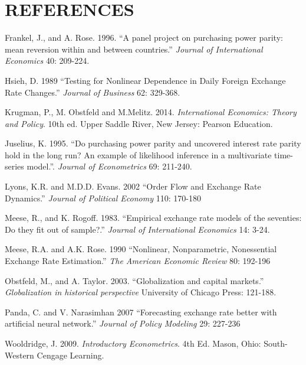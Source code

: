 \documentclass{sig-alternate-05-2015}
\begin{document}
\section*{REFERENCES}
\begin{hangref}

\item Frankel, J., and A. Rose. 1996.
``A panel project on purchasing power parity: mean reversion within and between countries.''
{\it Journal of International Economics} 40: 209-224.

\item Hsieh, D. 1989
``Testing for Nonlinear Dependence in Daily Foreign Exchange Rate Changes.''
{\it Journal of Business} 62: 329-368.

\item Krugman, P., M. Obstfeld and M.Melitz.  2014.
{\it International Economics: Theory and Policy}. 10th ed.
Upper Saddle River, New Jersey: Pearson Education.

\item Juselius, K. 1995.
``Do purchasing power parity and uncovered interest rate parity hold in the long run? An example of likelihood inference in a multivariate time-series model.''.
{\it Journal of Econometrics} 69: 211-240.

\item Lyons, K.R. and M.D.D. Evans. 2002
``Order Flow and Exchange Rate Dynamics.''
{\it Journal of Political Economy} 110: 170-180

\item Meese, R., and K. Rogoff. 1983.
``Empirical exchange rate models of the seventies: Do they fit out of sample?.'' 
{\it Journal of International Economics} 14: 3-24.

\item Meese, R.A. and A.K. Rose. 1990
``Nonlinear, Nonparametric, Nonessential Exchange Rate Estimation.''
{\it The American Economic Review} 80: 192-196 

\item Obstfeld, M., and A. Taylor. 2003.
``Globalization and capital markets.'' 
{\it Globalization in historical perspective}
University of Chicago Press: 121-188.

\item Panda, C. and V. Narasimhan 2007
``Forecasting exchange rate better with artificial neural network.''
{\it Journal of Policy Modeling} 29: 227-236

\item Wooldridge, J. 2009.
{\it Introductory Econometrics}. 4th Ed.
Mason, Ohio: South-Western Cengage Learning.

\end{hangref}
\end{document}
